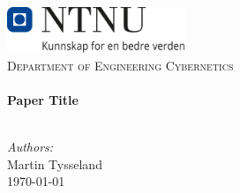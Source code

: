 



\def\TITLE{Paper Title} %


\def\AUTHORS{
    Martin Tysseland \\
}



\begin{titlepage}

    \vbox{ }

    \vbox{ }

    \begin{center}
        \includegraphics[width=0.40\textwidth]{Images/NTNU_logo.png}\\[1cm]
        \textsc{\LARGE Department of Engineering Cybernetics}\\[1.0cm]



        \vbox{ }
        \HRule \\[0.4cm]
        { \huge \bfseries \TITLE}\\[0.4cm]
        \HRule \\[1.5cm]
        \large


        \emph{Authors:}\\
        \AUTHORS


        \vfill
        {\large \today}
    \end{center}
\end{titlepage}








